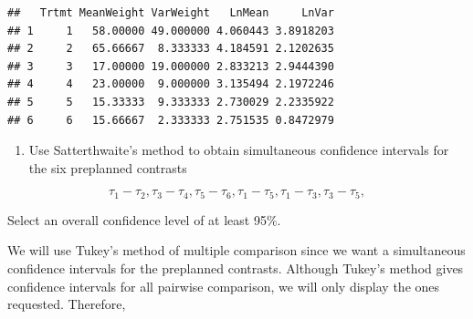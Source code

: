 \documentclass[12pt,]{article}
\newenvironment{Shaded}{\begin{snugshade}}{\end{snugshade}}
\newcommand{\KeywordTok}[1]{\textcolor[rgb]{0.13,0.29,0.53}{\textbf{#1}}}
\newcommand{\DecValTok}[1]{\textcolor[rgb]{0.00,0.00,0.81}{#1}}
\newcommand{\StringTok}[1]{\textcolor[rgb]{0.31,0.60,0.02}{#1}}
\newcommand{\CommentTok}[1]{\textcolor[rgb]{0.56,0.35,0.01}{\textit{#1}}}
\newcommand{\OperatorTok}[1]{\textcolor[rgb]{0.81,0.36,0.00}{\textbf{#1}}}
\newcommand{\NormalTok}[1]{#1}
\providecommand{\tightlist}{%
  \setlength{\itemsep}{0pt}\setlength{\parskip}{0pt}}
\begin{document}
\begin{Shaded}
\end{Shaded}

\begin{verbatim}
##   Trtmt MeanWeight VarWeight   LnMean     LnVar
## 1     1   58.00000 49.000000 4.060443 3.8918203
## 2     2   65.66667  8.333333 4.184591 2.1202635
## 3     3   17.00000 19.000000 2.833213 2.9444390
## 4     4   23.00000  9.000000 3.135494 2.1972246
## 5     5   15.33333  9.333333 2.730029 2.2335922
## 6     6   15.66667  2.333333 2.751535 0.8472979
\end{verbatim}

\begin{enumerate}
\def\labelenumi{(\alph{enumi})}
\setcounter{enumi}{1}
\tightlist
\item
  Use Satterthwaite's method to obtain simultaneous confidence intervals
  for the six preplanned contrasts
\end{enumerate}

\[\tau_1 -\tau_2, \tau_3 -\tau_4, \tau_5 -\tau_6, \tau_1 -\tau_5, \tau_1 -\tau_3, \tau_3 -\tau_5,\]

Select an overall confidence level of at least 95\%.

We will use Tukey's method of multiple comparison since we want a
simultaneous confidence intervals for the preplanned contrasts. Although
Tukey's method gives confidence intervals for all pairwise comparison,
we will only display the ones requested. Therefore,
\end{document}

